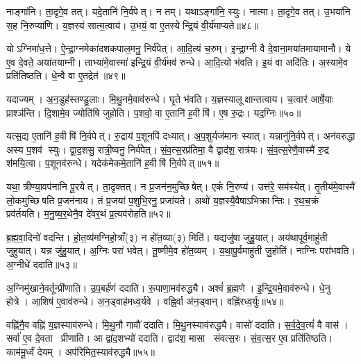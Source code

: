 नाङ्गा॑नि।
ता॒दृगे॒व तत्।
यदे॒तानि॑ नि॒र्वपेत्।
न तम्।
यथाऽङ्गा॑नि॒ स्युः।
नात्मा।
ता॒दृगे॒व तत्।
उ॒भया॑नि स॒ह नि॒रुप्या॑णि।
य॒ज्ञस्य॑ सात्म॒त्वाय॑।
उ॒भयं॒ वा ए॒तस्येन्द्रि॒यं वी॒र्य॑माप्यते॥४८॥

योऽग्निमा॑ध॒त्ते।
ऐ॒न्द्रा॒ग्नमेका॑दशकपाल॒मनु॒ निर्व॑पेत्।
आ॒दि॒त्यं च॒रुम्।
इ॒न्द्रा॒ग्नी वै दे॒वाना॒मया॑तमायामानौ।
ये ए॒व दे॒वते॒ अया॑तयाम्नी।
ताभ्या॑मे॒वास्मा॑ इन्द्रि॒यं वी॒र्य॑मव॑ रुन्धे।
आ॒दि॒त्यो भ॑वति।
इ॒यं वा अदि॑तिः।
अ॒स्यामे॒व प्रति॑तिष्ठति।
धे॒न्वै वा ए॒तद्रेत॑॥४९॥

यदाज्यम्।
अ॒न॒डुह॑स्तण्डु॒लाः।
मि॒थु॒नमे॒वाव॑रुन्धे।
घृ॒ते भ॑वति।
य॒ज्ञस्यालूक्षान्तत्वाय।
च॒त्वार॑ आर्\mbox{}षे॒याः प्राश्ञ॑न्ति।
दि॒शामे॒व ज्योति॑षि जुहोति।
प॒शवो॒ वा ए॒तानि॑ ह॒वीषि॑।
ए॒ष रु॒द्रः।
यद॒ग्निः॥५०॥

यत्स॒द्य ए॒तानि॑ ह॒वीषि॑ नि॒र्वपेत्।
रु॒द्राय॑ प॒शूनपि॑ दध्यात्।
अ॒प॒शुर्यज॑मानः स्यात्।
यन्नानु॑नि॒र्वपेत्।
अन॑वरुद्धा अस्य प॒शव॑ स्युः।
द्वा॒द॒शसु॒ रात्री॒ष्वनु॒ निर्व॑पेत्।
सं॒व॒त्स॒रप्र॑तिमा॒ वै द्वाद॑श॒ रात्र॑यः।
सं॒व॒त्स॒रेणै॒वास्मै॑ रु॒द्र श॑मयि॒त्वा।
प॒शूनव॑रुन्धे।
यदेक॑मेकमे॒तानि॑ ह॒वीषि॑ नि॒र्वपेत्॥५१॥

यथा॒ त्रीण्या॒वप॑नानि पू॒रयेत्।
ता॒दृक्तत्।
न प्र॒जन॑न॒\-मुच्छिषेत्।
एकं॑ नि॒रुप्य॑।
उत्त॑रे॒ सम॑स्येत्।
तृ॒तीय॑मे॒वास्मै॑ लो॒कमुच्छिषति प्र॒जन॑नाय।
तं प्र॒जया॑ प॒शुभि॒रनु॒ प्रजा॑यते।
अथो॑ य॒ज्ञस्यै॒वैषाऽभिक्रान्तिः।
र॒थ॒च॒क्रं प्रव॑र्तयति।
म॒नु॒ष्य॒र॒थेनै॒व दे॑वर॒थं प्र॒त्यव॑रोहति॥५२॥

ब्र॒ह्म॒वा॒दिनो॑ वदन्ति।
हो॒त॒व्य॑मग्निहो॒त्राँ(३) न हो॑त॒व्या(३) मिति॑।
यद्यजु॑षा जुहु॒यात्।
अय॑थापूर्व॒माहु॑ती जुहुयात्।
यन्न जु॑हु॒यात्।
अ॒ग्निः परा॑ भवेत्।
तू॒ष्णीमे॒व हो॑त॒व्यम्।
य॒था॒पू॒र्वमाहु॑ती जु॒होति॑।
नाग्निः परा॑भवति।
अ॒ग्नीधे॑ ददाति॥५३॥

अ॒ग्निमु॑खाने॒वर्तून्प्री॑णाति।
उ॒प॒बर्\mbox{}ह॑णं ददाति।
रू॒पाणा॒मव॑\-रुद्ध्यै।
अश्वं॑ ब्र॒ह्मणे।
इ॒न्द्रि॒यमे॒वाव॑रुन्धे।
धे॒नु होत्रे।
आ॒शिष॑ ए॒वाव॑रुन्धे।
अ॒न॒ड्वाह॑मध्व॒र्यवे।
वह्नि॒र्वा अ॑न॒ड्वान्।
वह्नि॑रध्व॒र्युः॥५४॥

वह्नि॑नै॒व वह्नि॑ य॒ज्ञस्याव॑रुन्धे।
मि॒थु॒नौ गावौ॑ ददाति।
मि॒थु॒नस्याव॑रुद्ध्यै।
वासो॑ ददाति।
स॒र्व॒दे॒व॒त्यं॑ वै वास॑।
सर्वा॑ ए॒व दे॒वता प्रीणाति।
आ द्वा॑द॒शभ्यो॑ ददाति।
द्वाद॑श॒ मासा संवत्स॒रः।
सं॒व॒त्स॒र ए॒व प्रति॑तिष्ठति।
काम॑मू॒र्ध्वं देयम्।
अप॑रिमित॒स्याव॑रुद्ध्यै॥५५॥\anuvakamend[आ॒दि॒त्ये तृती॑यम॒प्स्वासी॒त्तत्तेनावा॑रुन्धत॒ स्यादाप्यते॒ रेतो॒ऽग्निरेक॑मेकमे॒तानि॑ ह॒वीषि॑ नि॒र्वपेत्प्र॒त्यव॑रोहति ददात्यध्व॒र्युर्देय॒मेकं॑ च]

